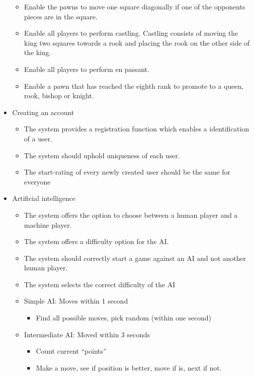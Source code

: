 \documentclass{article}
\begin{document}
\begin{flushleft}
\begin{itemize}
\begin{itemize}
		\item Enable the pawns to move one square diagonally if one of the opponents pieces are in the square.
		\item Enable all players to perform castling. Castling consists of moving the king two squares towards a rook and placing the rook on the other side of the king. 
		\item Enable all players to perform en passant.
		\item Enable a pawn that has reached the eighth rank to promote to a queen, rook, bishop or knight. 
	\end{itemize}
	\item Creating an account
	\begin{itemize}
		\item The system provides a registration function which enables a identification of a user.
		\item The system should uphold uniqueness of each user.
		\item The start-rating of every newly created user should be the same for everyone 
	\end{itemize}
	\item Artificial intelligence
	\begin{itemize}
	    \item The system offers the option to choose between a human player and a machine player.
		\item The system offers a difficulty option for the AI.
		\item The system should correctly start a game against an AI and not another human player.
		\item The system selects the correct difficulty of the AI
		\item Simple AI: Moves within 1 second
		\begin{itemize}
			\item Find all possible moves, pick random (within one second)
		\end{itemize}
		\item Intermediate AI: Moved within 3 seconds
		\begin{itemize}
			\item Count current “points”
			\item Make a move, see if position is better, move if is, next if not.
		\end{itemize}
	\end{itemize}
\end{itemize}


\end{flushleft}
\end{document}
